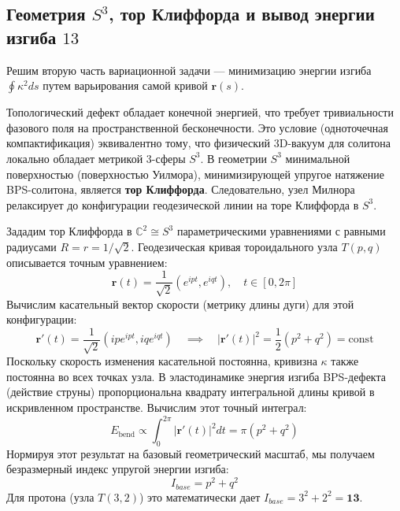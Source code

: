 \documentclass[12pt,a4paper]{article}
\begin{document}
	\subsection{Геометрия $S^3$, тор Клиффорда и вывод энергии изгиба $13$}
	Решим вторую часть вариационной задачи — минимизацию энергии изгиба $\oint \kappa^2 ds$ путем варьирования самой кривой $\mathbf{r}(s)$. 
	
	Топологический дефект обладает конечной энергией, что требует тривиальности фазового поля на пространственной бесконечности. Это условие (одноточечная компактификация) эквивалентно тому, что физический 3D-вакуум для солитона локально обладает метрикой 3-сферы $S^3$.
	В геометрии $S^3$ минимальной поверхностью (поверхностью Уилмора), минимизирующей упругое натяжение BPS-солитона, является \textbf{тор Клиффорда}. Следовательно, узел Милнора релаксирует до конфигурации геодезической линии на торе Клиффорда в $S^3$.
	
	Зададим тор Клиффорда в $\mathbb{C}^2 \cong S^3$ параметрическими уравнениями с равными радиусами $R = r = 1/\sqrt{2}$. Геодезическая кривая тороидального узла $T(p,q)$ описывается точным уравнением:
	\begin{equation}
		\mathbf{r}(t) = \frac{1}{\sqrt{2}} \left( e^{i p t}, e^{i q t} \right), \quad t \in [0, 2\pi]
	\end{equation}
	Вычислим касательный вектор скорости (метрику длины дуги) для этой конфигурации:
	\begin{equation}
		\mathbf{r}'(t) = \frac{1}{\sqrt{2}} \left( i p e^{i p t}, i q e^{i q t} \right) \quad \implies \quad |\mathbf{r}'(t)|^2 = \frac{1}{2} (p^2 + q^2) = \text{const}
	\end{equation}
	Поскольку скорость изменения касательной постоянна, кривизна $\kappa$ также постоянна во всех точках узла. В эластодинамике энергия изгиба BPS-дефекта (действие струны) пропорциональна квадрату интегральной длины кривой в искривленном пространстве. Вычислим этот точный интеграл:
	\begin{equation}
		E_{\text{bend}} \propto \int_0^{2\pi} |\mathbf{r}'(t)|^2 dt = \pi (p^2 + q^2)
	\end{equation}
	Нормируя этот результат на базовый геометрический масштаб, мы получаем безразмерный индекс упругой энергии изгиба:
	\begin{equation}
		I_{base} = p^2 + q^2
	\end{equation}
	Для протона (узла $T(3,2)$) это математически дает $I_{base} = 3^2 + 2^2 = \mathbf{13}$. 
	
\end{document}
